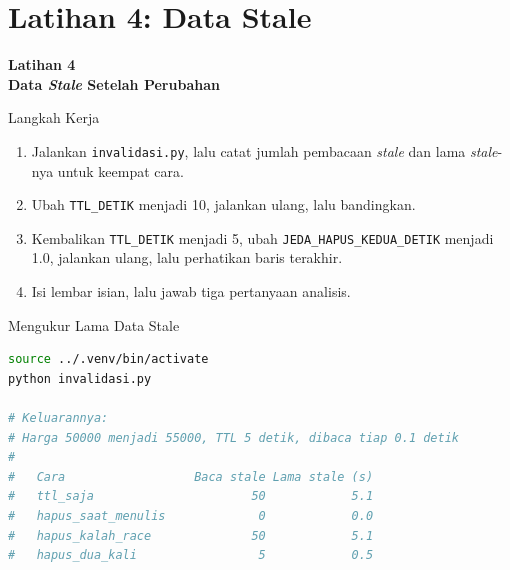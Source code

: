 \documentclass[aspectratio=169, table, 12pt]{beamer}
\begin{document}
\section{Latihan 4: Data Stale}

\begin{frame}{\hfill}
  \centering
  \Huge{\textbf{Latihan 4\\Data \textit{Stale} Setelah Perubahan}}
\end{frame}

\begin{frame}{{\Large Langkah Kerja}}
  \vspace{6pt}
  \begin{enumerate}
    \item Jalankan \texttt{invalidasi.py}, lalu catat jumlah pembacaan \textit{stale}
          dan lama \textit{stale}-nya untuk keempat cara.
    \item Ubah \texttt{TTL\_DETIK} menjadi 10, jalankan ulang, lalu
          bandingkan.
    \item Kembalikan \texttt{TTL\_DETIK} menjadi 5, ubah
          \texttt{JEDA\_HAPUS\_KEDUA\_DETIK} menjadi 1.0, jalankan ulang, lalu
          perhatikan baris terakhir.
    \item Isi lembar isian, lalu jawab tiga pertanyaan analisis.
  \end{enumerate}
\end{frame}

\begin{frame}[fragile]{{\Large Mengukur Lama Data Stale}}
  \vspace{4pt}
\begin{lstlisting}[language=bash]
source ../.venv/bin/activate
python invalidasi.py

# Keluarannya:
# Harga 50000 menjadi 55000, TTL 5 detik, dibaca tiap 0.1 detik
#
#   Cara                  Baca stale Lama stale (s)
#   ttl_saja                      50            5.1
#   hapus_saat_menulis             0            0.0
#   hapus_kalah_race              50            5.1
#   hapus_dua_kali                 5            0.5
\end{lstlisting}
\end{frame}
\end{document}
